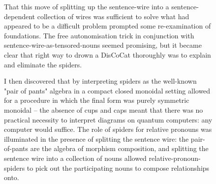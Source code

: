 \begin{figure}[h!]
\centering
{}
\caption{That this move of splitting up the sentence-wire into a sentence-dependent collection of wires was sufficient to solve what had appeared to be a difficult problem prompted some re-examination of foundations. The free autonomisation trick in conjunction with sentence-wire-as-tensored-nouns seemed promising, but it became clear that right way to drown a DisCoCat thoroughly was to explain and eliminate the spiders.}
\end{figure}

\begin{figure}[h!]
\centering
{}
\caption{I then discovered that by interpreting spiders as the well-known "pair of pants" algebra in a compact closed monoidal setting allowed for a procedure in which the final form was purely symmetric monoidal -- the absence of cups and caps meant that there was no practical necessity to interpret diagrams on quantum computers: any computer would suffice. The role of spiders for relative pronouns was illuminated in the presence of splitting the sentence wire: the pair-of-pants are the algebra of morphism composition, and splitting the sentence wire into a collection of nouns allowed relative-pronoun-spiders to pick out the participating nouns to compose relationships onto.}
\end{figure}

